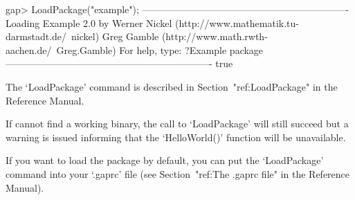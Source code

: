 \beginexample
gap> LoadPackage("example");
----------------------------------------------------------------
Loading  Example 2.0
by Werner Nickel (http://www.mathematik.tu-darmstadt.de/~nickel)
   Greg Gamble (http://www.math.rwth-aachen.de/~Greg.Gamble)
For help, type: ?Example package 
----------------------------------------------------------------
true
\endexample

The `LoadPackage' command is described  in  Section~"ref:LoadPackage"  in
the {\GAP} Reference Manual.

If {\GAP} cannot find a working binary, the call  to  `LoadPackage'  will
still succeed but a warning is issued informing that  the  `HelloWorld()'
function will be unavailable.

If you want to load the {\Example} package by default, you  can  put  the
`LoadPackage' command  into  your  `.gaprc'  file  (see  Section~"ref:The
.gaprc file" in the {\GAP} Reference Manual).

